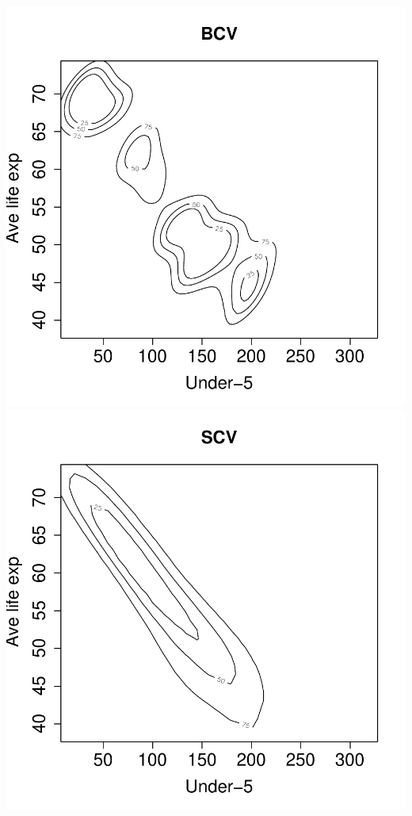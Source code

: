 \documentclass[a4paper,11pt]{article}
\begin{document}
\begin{center}
\includegraphics{kde-016}
\includegraphics{kde-017}
\end{center}

\end{document}
